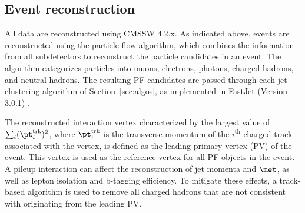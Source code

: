\subsection{Event reconstruction}
\label{evrecosection}

\ifnpas
All data are reconstructed using CMSSW 4.2.x.
\fi
\label{sec:preselection}
\label{sec:reconstruction}
As indicated above, events are reconstructed using the particle-flow 
algorithm, which
combines the information from all subdetectors to reconstruct
the particle candidates
in an event. 
The algorithm categorizes particles into muons,
electrons, photons, charged hadrons, and neutral hadrons. 
The resulting PF candidates are passed through each jet clustering 
algorithm of Section~\ref{sec:algos},  
as implemented in FastJet (Version 3.0.1) \cite{fastjet1,fastjet2}.



The reconstructed interaction vertex characterized by the largest value 
of $\sum_i ({\pt}^{\mathrm{trk}}_i)^2$, where ${\pt}^{\mathrm{trk}}_i$ is the transverse momentum of the 
$i^{\mathrm{th}}$ charged track associated with the vertex, is defined
as the leading primary vertex (PV) of the event. 
This vertex is used as the reference vertex for all PF objects in the event. 
A pileup interaction can affect the reconstruction of 
jet momenta and $\met$, as well as lepton isolation and b-tagging efficiency. 
To mitigate these effects, a track-based algorithm is used to remove 
all charged hadrons that are not consistent with originating from the
leading PV. 

